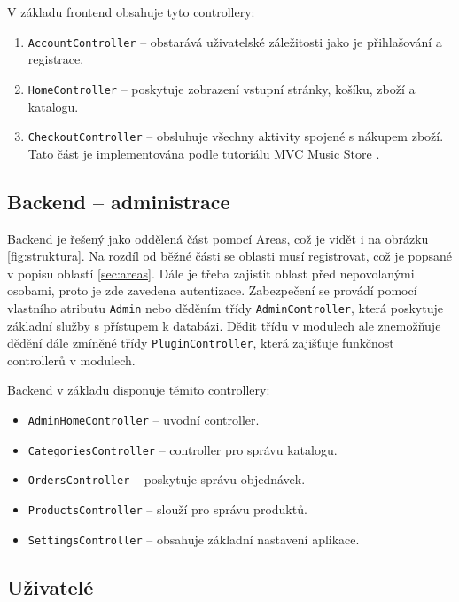 \documentclass[11pt,twoside,a4paper]{book}
\begin{document}
V základu frontend obsahuje tyto controllery:

\begin{enumerate}
\item \texttt{AccountController} -- obstarává uživatelské záležitosti jako je přihlašování a registrace.
\item \texttt{HomeController} -- poskytuje zobrazení vstupní stránky, košíku, zboží a katalogu.
\item \texttt{CheckoutController} -- obsluhuje všechny aktivity spojené s nákupem zboží. Tato část je implementována podle tutoriálu MVC Music Store \cite{musicstore}. 
\end{enumerate}

\subsection{Backend -- administrace}

Backend je řešený jako oddělená část pomocí \textsf{Areas}, což je vidět i na obrázku \ref{fig:struktura}. Na rozdíl od běžné části se oblasti musí registrovat, což je popsané v popisu oblastí \ref{sec:areas}. Dále je třeba zajistit oblast před nepovolanými osobami, proto je zde zavedena autentizace. Zabezpečení se provádí pomocí vlastního atributu \texttt{Admin} nebo děděním třídy \texttt{AdminController}, která poskytuje základní služby s přístupem k databázi. Dědit třídu v modulech ale znemožňuje dědění dále zmíněné třídy \texttt{PluginController}, která zajišťuje funkčnost controllerů v modulech.

Backend v základu disponuje těmito controllery:

\begin{itemize}
\item \texttt{AdminHomeController} -- uvodní controller.
\item \texttt{CategoriesController} -- controller pro správu katalogu.
\item \texttt{OrdersController} -- poskytuje správu objednávek.
\item \texttt{ProductsController} -- slouží pro správu produktů.
\item \texttt{SettingsController} -- obsahuje základní nastavení aplikace.
\end{itemize}

\subsection{Uživatelé}
\end{document}

